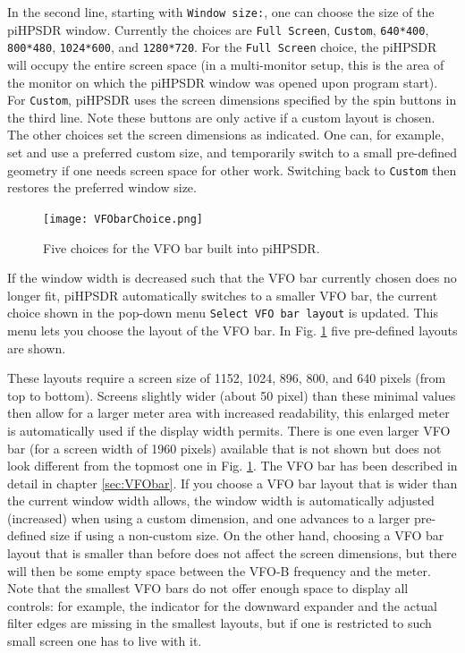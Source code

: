 \documentclass[12pt]{book}
\def\rett#1{\texttt{\color{red}#1}}
\def\pH{pi\-HPSDR\xspace}
\begin{document}
In the second line, starting with \rett{Window size:}, one can choose the size of the \pH window.
Currently the choices are \rett{Full Screen}, \rett{Custom}, \rett{640*400}, \rett{800*480},
\rett{1024*600}, and \rett{1280*720}. For the \rett{Full Screen}  choice, the \pH will occupy the entire
screen space (in a multi-monitor setup, this is the area of the monitor
on which the \pH window was opened upon program start).
For \rett{Custom}, \pH uses the screen dimensions specified by the spin buttons
in the third line. Note these buttons are only active if a custom layout is chosen. The other choices
set the screen dimensions as indicated. One can, for example, set and use a preferred custom size,
and temporarily switch to a small pre-defined geometry if one
needs screen space for other work. Switching back to \rett{Custom} then restores the preferred
window size.

\begin{figure}[ht!]
\center
\texttt{[image: VFObarChoice.png]}
\caption{Five choices for the VFO bar built into \pH.}
\label{fig:VFObarChoice}
\end{figure}

If the window width is decreased such that the VFO bar currently chosen does no longer fit,
\pH automatically switches to a smaller VFO bar, the
current choice shown in the
pop-down menu \rett{Select VFO bar layout} is updated. This menu lets you choose
the layout of the VFO
bar. In Fig. \ref{fig:VFObarChoice} five pre-defined layouts are shown.

These layouts require a screen size of 1152, 1024, 896, 800, and 640 pixels (from top to
bottom). Screens slightly wider (about 50 pixel) than these minimal values then allow for a larger meter
area with increased readability, this enlarged meter is automatically used if the display
width permits. There is one even larger VFO bar (for a screen width of 1960 pixels) available
that is not shown but does not look different from the topmost one in Fig. \ref{fig:VFObarChoice}.
The VFO bar has been described in detail in chapter
\ref{sec:VFObar}. If you choose a VFO bar layout that is wider than the current
window width allows, the window width is automatically adjusted (increased) when using a custom
dimension, and one advances to a larger pre-defined size if using a non-custom size. On the
other hand, choosing a VFO bar layout that is smaller than before does not affect
the screen dimensions, but there will then be some empty space between the VFO-B
frequency and the meter. Note that the smallest VFO bars do not offer enough space to display all controls:
for example, the indicator for the downward expander and the actual filter edges are  missing
in  the smallest layouts, but if one is restricted to such small screen one has to live with it.
\end{document}
